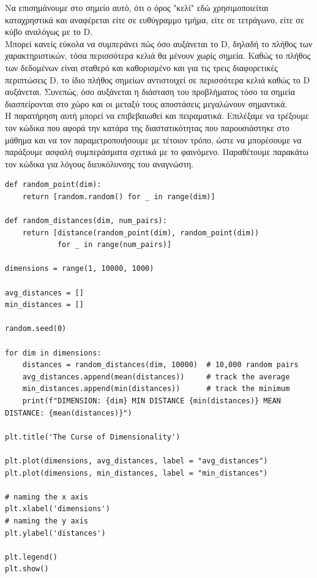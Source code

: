 \documentclass[12pt]{article}
\begin{document}
Να επισημάνουμε στο σημείο αυτό, ότι ο όρος "κελί" εδώ χρησιμοποιείται καταχρηστικά και αναφέρεται είτε σε ευθύγραμμο τμήμα, είτε σε τετράγωνο, είτε σε κύβο αναλόγως με το D. \\

Μπορεί κανείς εύκολα να συμπεράνει πώς όσο αυξάνεται το D, δηλαδή το πλήθος των χαρακτηριστικών, τόσα περισσότερα κελιά θα μένουν χωρίς σημεία. Καθώς το πλήθος των δεδομένων είναι σταθερό και καθορισμένο και για τις τρεις διαφορετικές περιπτώσεις D, το ίδιο πλήθος σημείων αντιστοιχεί σε περισσότερα κελιά καθώς το D αυξάνεται. Συνεπώς, όσο αυξάνεται η διάσταση του προβλήματος τόσο τα σημεία διασπείρονται στο χώρο και οι μεταξύ τους αποστάσεις μεγαλώνουν σημαντικά. \\

Η παρατήρηση αυτή μπορεί να επιβεβαιωθεί και πειραματικά. Επιλέξαμε να τρέξουμε τον κώδικα που αφορά την κατάρα της διαστατικότητας που παρουσιάστηκε στο μάθημα και να τον παραμετροποιήσουμε με τέτοιον τρόπο, ώστε να μπορέσουμε να παράξουμε ασφαλή συμπεράσματα σχετικά με το φαινόμενο. Παραθέτουμε παρακάτω τον κώδικα για λόγους διευκόλυνσης του αναγνώστη. \\ 

\begin{lstlisting}
def random_point(dim):
	return [random.random() for _ in range(dim)]

def random_distances(dim, num_pairs):
	return [distance(random_point(dim), random_point(dim))
			for _ in range(num_pairs)]

dimensions = range(1, 10000, 1000)

avg_distances = []
min_distances = []

random.seed(0)

for dim in dimensions:
	distances = random_distances(dim, 10000)  # 10,000 random pairs
	avg_distances.append(mean(distances))     # track the average
	min_distances.append(min(distances))      # track the minimum
	print(f"DIMENSION: {dim} MIN DISTANCE {min(distances)} MEAN DISTANCE: {mean(distances)}")

plt.title('The Curse of Dimensionality') 

plt.plot(dimensions, avg_distances, label = "avg_distances")
plt.plot(dimensions, min_distances, label = "min_distances")

# naming the x axis 
plt.xlabel('dimensions') 
# naming the y axis 
plt.ylabel('distances')

plt.legend()     
plt.show()            
\end{lstlisting}
\end{document}
